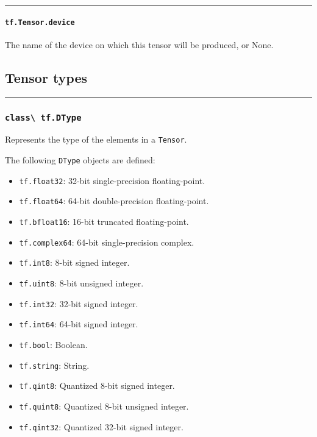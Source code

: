 \begin{center}\rule{0.5\linewidth}{\linethickness}\end{center}

\paragraph{\texorpdfstring{\lstinline{tf.Tensor.device}
}{tf.Tensor.device }}\label{tf.tensor.device}

The name of the device on which this tensor will be produced, or None.

\subsection{Tensor types }\label{tensor-types}

\begin{center}\rule{0.5\linewidth}{\linethickness}\end{center}

\subsubsection{\texorpdfstring{\lstinline{class\ tf.DType}
}{class tf.DType }}\label{class-tf.dtype}

Represents the type of the elements in a \lstinline{Tensor}.

The following \lstinline{DType} objects are defined:

\begin{itemize}
\item
  \lstinline{tf.float32}: 32-bit single-precision floating-point.
\item
  \lstinline{tf.float64}: 64-bit double-precision floating-point.
\item
  \lstinline{tf.bfloat16}: 16-bit truncated floating-point.
\item
  \lstinline{tf.complex64}: 64-bit single-precision complex.
\item
  \lstinline{tf.int8}: 8-bit signed integer.
\item
  \lstinline{tf.uint8}: 8-bit unsigned integer.
\item
  \lstinline{tf.int32}: 32-bit signed integer.
\item
  \lstinline{tf.int64}: 64-bit signed integer.
\item
  \lstinline{tf.bool}: Boolean.
\item
  \lstinline{tf.string}: String.
\item
  \lstinline{tf.qint8}: Quantized 8-bit signed integer.
\item
  \lstinline{tf.quint8}: Quantized 8-bit unsigned integer.
\item
  \lstinline{tf.qint32}: Quantized 32-bit signed integer.
\end{itemize}


